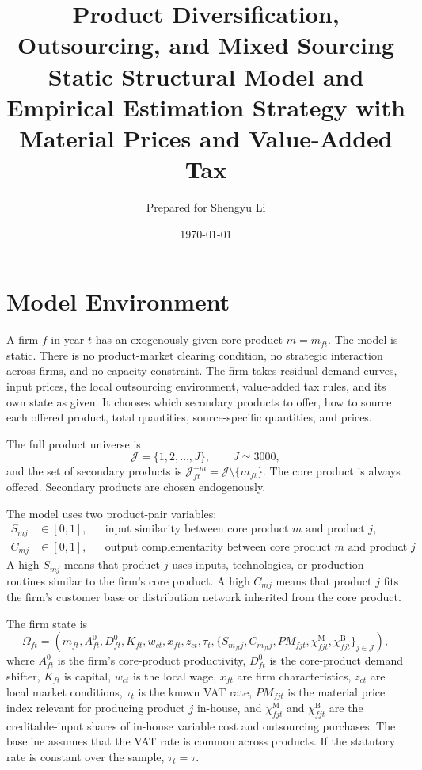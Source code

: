 \documentclass[11pt,a4paper]{article}
\title{\textbf{Product Diversification, Outsourcing, and Mixed Sourcing}\\[0.35em]
\large Static Structural Model and Empirical Estimation Strategy with Material Prices and Value-Added Tax}
\author{Prepared for Shengyu Li}
\date{\today}
\newcommand{\mc}{\mathcal}
\newcommand{\M}{\mathrm{M}}
\newcommand{\B}{\mathrm{B}}
\begin{document}
\maketitle

\section{Model Environment}

A firm $f$ in year $t$ has an exogenously given core product $m=m_{ft}$. The model is static. There is no product-market clearing condition, no strategic interaction across firms, and no capacity constraint. The firm takes residual demand curves, input prices, the local outsourcing environment, value-added tax rules, and its own state as given. It chooses which secondary products to offer, how to source each offered product, total quantities, source-specific quantities, and prices.

The full product universe is
\[
    \mc{J}=\{1,2,\ldots,J\},\qquad J\simeq 3000,
\]
and the set of secondary products is $\mc{J}^{-m}_{ft}=\mc{J}\setminus\{m_{ft}\}$. The core product is always offered. Secondary products are chosen endogenously.

The model uses two product-pair variables:
\begin{align*}
    S_{mj}&\in[0,1], &&\text{input similarity between core product $m$ and product $j$},\\
    C_{mj}&\in[0,1], &&\text{output complementarity between core product $m$ and product $j$}.
\end{align*}
A high $S_{mj}$ means that product $j$ uses inputs, technologies, or production routines similar to the firm's core product. A high $C_{mj}$ means that product $j$ fits the firm's customer base or distribution network inherited from the core product.

The firm state is
\begin{equation}
    \Omega_{ft}
    =\left(
        m_{ft},
        A^0_{ft},
        D^0_{ft},
        K_{ft},
        w_{ct},
        x_{ft},
        z_{ct},
        \tau_t,
        \{S_{m_{ft}j},C_{m_{ft}j},PM_{fjt},\chi^{\M}_{fjt},\chi^{\B}_{fjt}\}_{j\in\mc{J}}
    \right),
    \label{eq:state}
\end{equation}
where $A^0_{ft}$ is the firm's core-product productivity, $D^0_{ft}$ is the core-product demand shifter, $K_{ft}$ is capital, $w_{ct}$ is the local wage, $x_{ft}$ are firm characteristics, $z_{ct}$ are local market conditions, $\tau_t$ is the known VAT rate, $PM_{fjt}$ is the material price index relevant for producing product $j$ in-house, and $\chi^{\M}_{fjt}$ and $\chi^{\B}_{fjt}$ are the creditable-input shares of in-house variable cost and outsourcing purchases. The baseline assumes that the VAT rate is common across products. If the statutory rate is constant over the sample, $\tau_t=\tau$.
\end{document}
